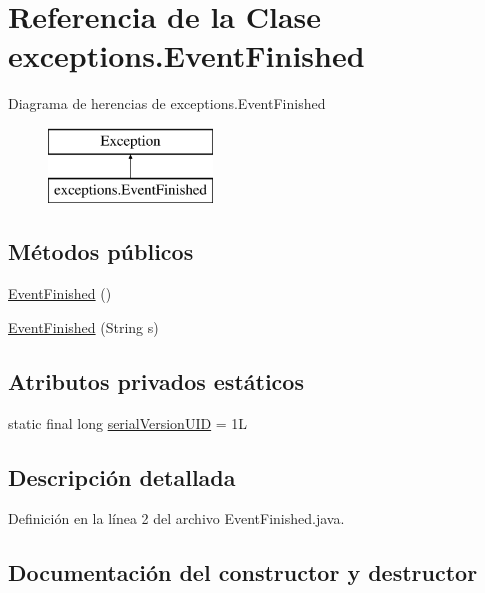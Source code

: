 \hypertarget{classexceptions_1_1EventFinished}{}\section{Referencia de la Clase exceptions.\+Event\+Finished}
\label{classexceptions_1_1EventFinished}
Diagrama de herencias de exceptions.\+Event\+Finished\begin{figure}[H]
\begin{center}
\leavevmode
\includegraphics[height=2.000000cm]{classexceptions_1_1EventFinished}
\end{center}
\end{figure}
\subsection*{Métodos públicos}
\begin{DoxyCompactItemize}
\item 
\mbox{\hyperlink{classexceptions_1_1EventFinished_ae996a08072c12b77129a62d532e3ea49}{Event\+Finished}} ()
\item 
\mbox{\hyperlink{classexceptions_1_1EventFinished_af9ee70ec7c85d6b2078618e86b61496b}{Event\+Finished}} (String s)
\end{DoxyCompactItemize}
\subsection*{Atributos privados estáticos}
\begin{DoxyCompactItemize}
\item 
static final long \mbox{\hyperlink{classexceptions_1_1EventFinished_aa8201c32267eb18e31b7322fb020c5af}{serial\+Version\+U\+ID}} = 1L
\end{DoxyCompactItemize}


\subsection{Descripción detallada}


Definición en la línea 2 del archivo Event\+Finished.\+java.



\subsection{Documentación del constructor y destructor}
\mbox{\label{classexceptions_1_1EventFinished_ae996a08072c12b77129a62d532e3ea49}} 
